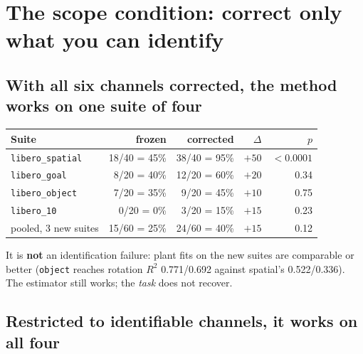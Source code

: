\documentclass[11pt,a4paper]{article}
\newcommand{\code}[1]{\texttt{\small #1}}
\begin{document}
\section{The scope condition: correct only what you can identify}
\label{sec:scope}

\subsection{With all six channels corrected, the method works on one suite of four}

\begin{center}
\begin{tabular}{lrrrr}
\toprule
\textbf{Suite} & \textbf{frozen} & \textbf{corrected} & $\Delta$ & $p$ \\
\midrule
\code{libero\_spatial} & 18/40 = 45\% & 38/40 = 95\% & $+50$ & $\mathbf{<0.0001}$ \\
\code{libero\_goal}    & 8/20 = 40\%  & 12/20 = 60\% & $+20$ & 0.34 \\
\code{libero\_object}  & 7/20 = 35\%  & 9/20 = 45\%  & $+10$ & 0.75 \\
\code{libero\_10}      & 0/20 = 0\%   & 3/20 = 15\%  & $+15$ & 0.23 \\
\midrule
pooled, 3 new suites   & 15/60 = 25\% & 24/60 = 40\% & $+15$ & 0.12 \\
\bottomrule
\end{tabular}
\end{center}

It is \textbf{not} an identification failure: plant fits on the new suites are
comparable or better (\code{object} reaches rotation $R^2$ 0.771/0.692 against
spatial's 0.522/0.336). The estimator still works; the \emph{task} does not
recover.

\subsection{Restricted to identifiable channels, it works on all four}
\end{document}
